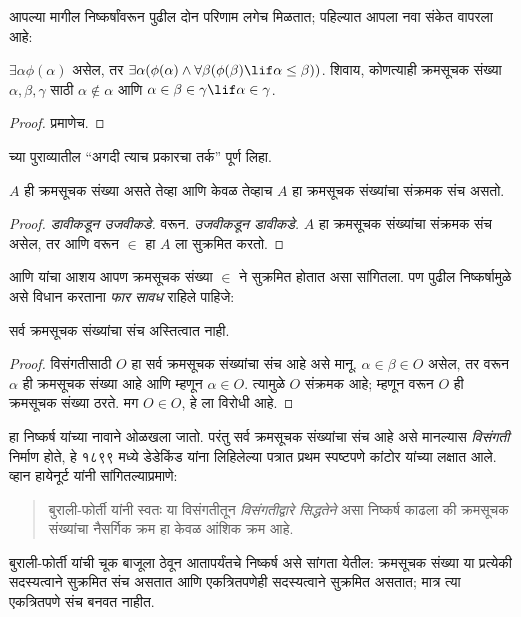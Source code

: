 \documentclass[../../../include/open-logic-section]{subfiles}
\begin{document}
आपल्या मागील निष्कर्षांवरून पुढील दोन परिणाम लगेच मिळतात; पहिल्यात आपला नवा संकेत वापरला आहे:

\begin{cor}
$\exists \alpha\phi(\alpha)$ असेल, तर $\exists \alpha(\phi(\alpha)
\land \forall \beta(\phi(\beta) \lif \alpha \leq \beta))$.
शिवाय, कोणत्याही क्रमसूचक संख्या $\alpha, \beta, \gamma$ साठी $\alpha
\notin \alpha$ आणि $\alpha \in \beta \in \gamma \lif \alpha \in
\gamma$.
\end{cor}

\begin{proof}
 प्रमाणेच.
\end{proof}

\begin{prob}
 च्या पुराव्यातील ``अगदी त्याच प्रकारचा तर्क'' पूर्ण लिहा.
\end{prob}

\begin{cor}
$A$ ही क्रमसूचक संख्या असते तेव्हा आणि केवळ तेव्हाच $A$ हा क्रमसूचक संख्यांचा संक्रमक संच असतो.
\end{cor}

\begin{proof}
\emph{डावीकडून उजवीकडे.}  वरून. \emph{उजवीकडून डावीकडे.} $A$ हा क्रमसूचक संख्यांचा संक्रमक संच असेल, तर  आणि  वरून $\in$ हा $A$ ला सुक्रमित करतो.
\end{proof}

 आणि  यांचा आशय आपण क्रमसूचक संख्या $\in$ ने सुक्रमित होतात असा सांगितला. पण पुढील निष्कर्षामुळे असे विधान करताना \emph{फार सावध} राहिले पाहिजे:

\begin{thm}[बुराली-फोर्ती विरोधापत्ती]
सर्व क्रमसूचक संख्यांचा संच अस्तित्वात नाही.
\end{thm}

\begin{proof}
विसंगतीसाठी $O$ हा सर्व क्रमसूचक संख्यांचा संच आहे असे मानू. $\alpha \in
\beta \in O$ असेल, तर  वरून $\alpha$ ही क्रमसूचक संख्या आहे आणि म्हणून $\alpha \in O$. त्यामुळे $O$ संक्रमक आहे; म्हणून  वरून $O$ ही क्रमसूचक संख्या ठरते. मग $O \in O$, हे  ला विरोधी आहे.
\end{proof}
\noindent
हा निष्कर्ष \citeauthor{Burali-Forti1897} यांच्या नावाने ओळखला जातो. परंतु सर्व क्रमसूचक संख्यांचा संच आहे असे मानल्यास \emph{विसंगती} निर्माण होते, हे १८९९ मध्ये डेडेकिंड यांना लिहिलेल्या पत्रात प्रथम स्पष्टपणे कांटोर यांच्या लक्षात आले. व्हान हायेनूर्ट यांनी सांगितल्याप्रमाणे:
\begin{quote}
  बुराली-फोर्ती यांनी स्वतः या विसंगतीतून \emph{विसंगतीद्वारे सिद्धतेने} असा निष्कर्ष काढला की क्रमसूचक संख्यांचा नैसर्गिक क्रम हा केवळ आंशिक क्रम आहे.
  \citep[p.~105]{Heijenoort1967}
\end{quote}
बुराली-फोर्ती यांची चूक बाजूला ठेवून आतापर्यंतचे निष्कर्ष असे सांगता येतील: क्रमसूचक संख्या या प्रत्येकी सदस्यत्वाने सुक्रमित संच असतात आणि एकत्रितपणेही सदस्यत्वाने सुक्रमित असतात; मात्र त्या एकत्रितपणे संच बनवत नाहीत.
\end{document}
